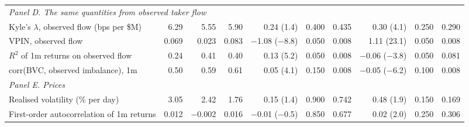 \begin{tabular}{lrrrrrrrrr}
\multicolumn{10}{l}{\emph{Panel D. The same quantities from observed taker flow}}\\
Kyle's $\lambda$, observed flow (bps per \$M) & 6.29 & 5.55 & 5.90 & 0.24 (1.4) & 0.400 & 0.435 & 0.30 (4.1) & 0.250 & 0.290\\
VPIN, observed flow & 0.069 & 0.023 & 0.083 & \ensuremath{-}1.08 (\ensuremath{-}8.8) & 0.050 & 0.008 & 1.11 (23.1) & 0.050 & 0.008\\
$R^2$ of 1m returns on observed flow & 0.24 & 0.41 & 0.40 & 0.13 (5.2) & 0.050 & 0.008 & \ensuremath{-}0.06 (\ensuremath{-}3.8) & 0.050 & 0.081\\
corr(BVC, observed imbalance), 1m & 0.50 & 0.59 & 0.61 & 0.05 (4.1) & 0.150 & 0.008 & \ensuremath{-}0.05 (\ensuremath{-}6.2) & 0.100 & 0.008\\
\multicolumn{10}{l}{\emph{Panel E. Prices}}\\
Realised volatility (\% per day) & 3.05 & 2.42 & 1.76 & 0.15 (1.4) & 0.900 & 0.742 & 0.48 (1.9) & 0.150 & 0.169\\
First-order autocorrelation of 1m returns & 0.012 & \ensuremath{-}0.002 & 0.016 & \ensuremath{-}0.01 (\ensuremath{-}0.5) & 0.850 & 0.677 & 0.02 (2.0) & 0.250 & 0.306\\
\bottomrule
\end{tabular}
